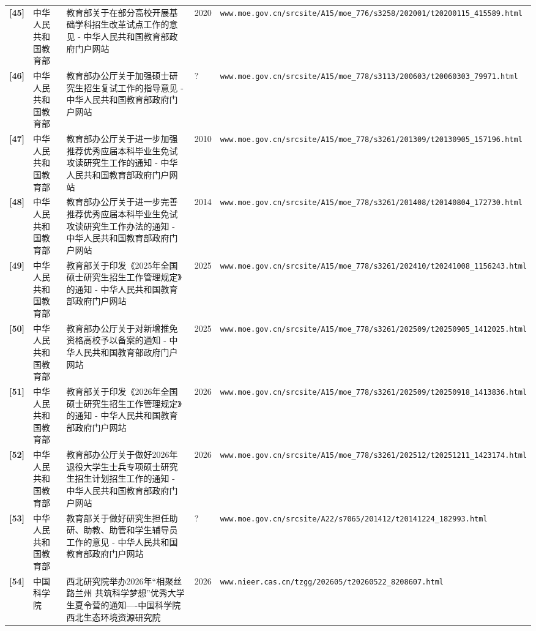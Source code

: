 {\begin{longtable}{@{}p{1.15cm}p{2.9cm}p{6.3cm}p{0.85cm}p{5.0cm}@{}}
\textbf{[45]} & 中华人民共和国教育部 & 教育部关于在部分高校开展基础学科招生改革试点工作的意见 - 中华人民共和国教育部政府门户网站 & 2020 & \texttt{www.moe.gov.cn/srcsite/A15/moe\_776/s3258/202001/t20200115\_415589.html} \\
\textbf{[46]} & 中华人民共和国教育部 & 教育部办公厅关于加强硕士研究生招生复试工作的指导意见 - 中华人民共和国教育部政府门户网站 & ? & \texttt{www.moe.gov.cn/srcsite/A15/moe\_778/s3113/200603/t20060303\_79971.html} \\
\textbf{[47]} & 中华人民共和国教育部 & 教育部办公厅关于进一步加强推荐优秀应届本科毕业生免试攻读研究生工作的通知 - 中华人民共和国教育部政府门户网站 & 2010 & \texttt{www.moe.gov.cn/srcsite/A15/moe\_778/s3261/201309/t20130905\_157196.html} \\
\textbf{[48]} & 中华人民共和国教育部 & 教育部办公厅关于进一步完善推荐优秀应届本科毕业生免试攻读研究生工作办法的通知 - 中华人民共和国教育部政府门户网站 & 2014 & \texttt{www.moe.gov.cn/srcsite/A15/moe\_778/s3261/201408/t20140804\_172730.html} \\
\textbf{[49]} & 中华人民共和国教育部 & 教育部关于印发《2025年全国硕士研究生招生工作管理规定》的通知 - 中华人民共和国教育部政府门户网站 & 2025 & \texttt{www.moe.gov.cn/srcsite/A15/moe\_778/s3261/202410/t20241008\_1156243.html} \\
\textbf{[50]} & 中华人民共和国教育部 & 教育部办公厅关于对新增推免资格高校予以备案的通知 - 中华人民共和国教育部政府门户网站 & 2025 & \texttt{www.moe.gov.cn/srcsite/A15/moe\_778/s3261/202509/t20250905\_1412025.html} \\
\textbf{[51]} & 中华人民共和国教育部 & 教育部关于印发《2026年全国硕士研究生招生工作管理规定》的通知 - 中华人民共和国教育部政府门户网站 & 2026 & \texttt{www.moe.gov.cn/srcsite/A15/moe\_778/s3261/202509/t20250918\_1413836.html} \\
\textbf{[52]} & 中华人民共和国教育部 & 教育部办公厅关于做好2026年退役大学生士兵专项硕士研究生招生计划招生工作的通知 - 中华人民共和国教育部政府门户网站 & 2026 & \texttt{www.moe.gov.cn/srcsite/A15/moe\_778/s3261/202512/t20251211\_1423174.html} \\
\textbf{[53]} & 中华人民共和国教育部 & 教育部关于做好研究生担任助研、助教、助管和学生辅导员工作的意见 - 中华人民共和国教育部政府门户网站 & ? & \texttt{www.moe.gov.cn/srcsite/A22/s7065/201412/t20141224\_182993.html} \\
\textbf{[54]} & 中国科学院 & 西北研究院举办2026年“相聚丝路兰州 共筑科学梦想”优秀大学生夏令营的通知----中国科学院西北生态环境资源研究院 & 2026 & \texttt{www.nieer.cas.cn/tzgg/202605/t20260522\_8208607.html} \\

\end{longtable}}
